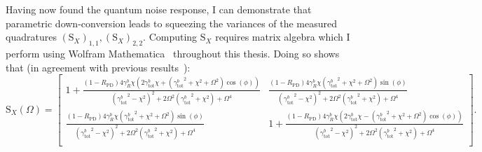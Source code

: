Having now found the quantum noise response, I can demonstrate that parametric down-conversion leads to squeezing the variances of the measured quadratures $(\text{S}_X)_{1,1}, (\text{S}_X)_{2,2}$. Computing $\text{S}_X$ requires matrix algebra which I perform using Wolfram Mathematica~\cite{} throughout this thesis. Doing so shows that (in agreement with previous results~\cite{}): 
\begin{equation}\label{eq:dOPO_full_freedom}
\text{S}_X(\Omega)=\left[
\begin{array}{cc}
 1+\frac{(1-R_\text{PD})4 \gamma^b_R \chi  \left(2 \gamma^b_\text{tot} \chi +\left({\gamma^b_\text{tot}}^2+\chi ^2+\Omega ^2\right) \cos (\phi )\right)}{\left({\gamma^b_\text{tot}}^2-\chi ^2\right)^2+2 \Omega ^2 \left({\gamma^b_\text{tot}}^2+\chi ^2\right)+\Omega ^4} 
 & \frac{(1-R_\text{PD})4 \gamma^b_R \chi  \left({\gamma^b_\text{tot}}^2+\chi ^2+\Omega ^2\right) \sin (\phi )}{\left({\gamma^b_\text{tot}}^2-\chi ^2\right)^2+2 \Omega ^2 \left({\gamma^b_\text{tot}}^2+\chi ^2\right)+\Omega ^4} \\
 \frac{(1-R_\text{PD})4 \gamma^b_R \chi  \left({\gamma^b_\text{tot}}^2+\chi ^2+\Omega ^2\right) \sin (\phi )}{\left({\gamma^b_\text{tot}}^2-\chi ^2\right)^2+2 \Omega ^2 \left({\gamma^b_\text{tot}}^2+\chi ^2\right)+\Omega ^4} 
 & 1+\frac{(1-R_\text{PD})4 \gamma^b_R \chi  \left(2 \gamma^b_\text{tot} \chi -\left({\gamma^b_\text{tot}}^2+\chi ^2+\Omega ^2\right) \cos (\phi )\right)}{\left({\gamma^b_\text{tot}}^2-\chi ^2\right)^2+2 \Omega ^2 \left({\gamma^b_\text{tot}}^2+\chi ^2\right)+\Omega ^4} \\
\end{array}
\right].\end{equation}
